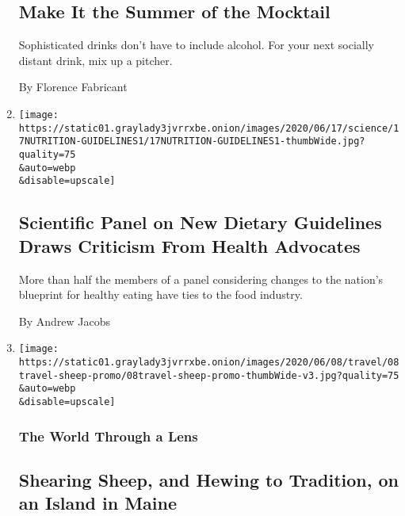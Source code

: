 \begin{enumerate}
  \hypertarget{make-it-the-summer-of-the-mocktail}{%
  \subsection{Make It the Summer of the
  Mocktail}\label{make-it-the-summer-of-the-mocktail}}

  Sophisticated drinks don't have to include alcohol. For your next
  socially distant drink, mix up a pitcher.

  By Florence Fabricant
\item
  \href{/2020/06/17/health/diet-nutrition-guidelines.html}{}

  \texttt{[image: https://static01.graylady3jvrrxbe.onion/images/2020/06/17/science/17NUTRITION-GUIDELINES1/17NUTRITION-GUIDELINES1-thumbWide.jpg?quality=75\\\&auto=webp\\\&disable=upscale]}

  \hypertarget{scientific-panel-on-new-dietary-guidelines-draws-criticism-from-health-advocates}{%
  \subsection{Scientific Panel on New Dietary Guidelines Draws Criticism
  From Health
  Advocates}\label{scientific-panel-on-new-dietary-guidelines-draws-criticism-from-health-advocates}}

  More than half the members of a panel considering changes to the
  nation's blueprint for healthy eating have ties to the food industry.

  By Andrew Jacobs
\item
  \href{/2020/06/08/travel/lens-sheep-island-maine.html}{}

  \texttt{[image: https://static01.graylady3jvrrxbe.onion/images/2020/06/08/travel/08travel-sheep-promo/08travel-sheep-promo-thumbWide-v3.jpg?quality=75\\\&auto=webp\\\&disable=upscale]}

  \hypertarget{the-world-through-a-lens}{%
  \subsubsection{The World Through a
  Lens}\label{the-world-through-a-lens}}

  \hypertarget{shearing-sheep-and-hewing-to-tradition-on-an-island-in-maine}{%
  \subsection{Shearing Sheep, and Hewing to Tradition, on an Island in
  Maine}\label{shearing-sheep-and-hewing-to-tradition-on-an-island-in-maine}}


\end{enumerate}
